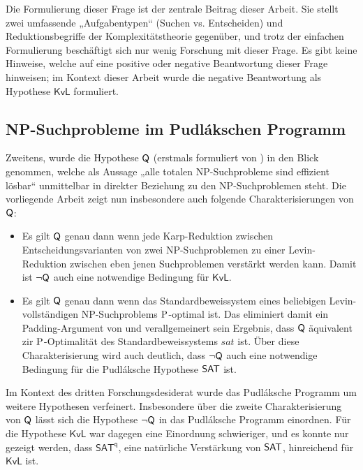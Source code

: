 Die Formulierung dieser Frage ist der zentrale Beitrag dieser Arbeit.
Sie stellt zwei umfassende „Aufgabentypen“ (Suchen vs. Entscheiden) und Reduktionsbegriffe der Komplexitätstheorie gegenüber, und trotz der einfachen Formulierung beschäftigt sich nur wenig Forschung mit dieser Frage.
Es gibt keine Hinweise, welche auf eine positive oder negative Beantwortung dieser Frage hinweisen; im Kontext dieser Arbeit wurde die negative Beantwortung als Hypothese $\mathsf{KvL}$ formuliert.



\subsection*{NP-Suchprobleme im Pudlákschen Programm}

Zweitens, wurde die Hypothese $\hQ$ (erstmals formuliert von \cite{fortnow_separability_1993}) in den Blick genommen, welche als Aussage 
„alle totalen NP-Suchprobleme sind effizient lösbar“ unmittelbar in direkter Beziehung zu den NP-Suchproblemen steht.
Die vorliegende Arbeit zeigt nun insbesondere auch folgende Charakterisierungen von $\hQ$:
\begin{itemize}[midpenalty=0]
    \item Es gilt $\hQ$ genau dann wenn jede Karp-Reduktion zwischen Entscheidungsvarianten von zwei NP-Suchproblemen zu einer Levin-Reduktion zwischen eben jenen Suchproblemen verstärkt werden kann. Damit ist $\neg\hQ$ auch eine notwendige Bedingung für $\mathsf{KvL}$.
    \item Es gilt $\hQ$ genau dann wenn das Standardbeweissystem eines beliebigen Levin-vollständigen NP-Suchproblems $\P$-optimal ist. Das eliminiert damit ein Padding-Argument von \textcite{messner_simulation_2001} und verallgemeinert sein Ergebnis, dass $\hQ$ äquivalent zir $\P$-Optimalität des Standardbeweissystems $\mathit{sat}$ ist. Über diese Charakterisierung wird auch deutlich, dass $\neg\hQ$ auch eine notwendige Bedingung für die Pudláksche Hypothese $\hSAT$ ist.
\end{itemize}
Im Kontext des dritten Forschungsdesiderat wurde das Pudláksche Programm um weitere Hypothesen verfeinert. Insbesondere über die zweite Charakterisierung von $\hQ$ lässt sich die Hypothese $\neg\hQ$ in das Pudláksche Programm einordnen. Für die Hypothese $\mathsf{KvL}$ war dagegen eine Einordnung schwieriger, und es konnte nur gezeigt werden, dass $\mathsf{SAT^{q}}$, eine natürliche Verstärkung von $\hSAT$, hinreichend für $\mathsf{KvL}$ ist.

